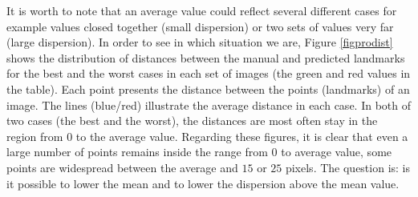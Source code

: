 \documentclass[review]{elsarticle}
\begin{document}
It is worth to note that an average value could reflect several different
cases for example values closed together (small dispersion) or two sets of
values very far (large dispersion). In order to see in which situation
we are, Figure \ref{figprodist} shows the distribution of distances
between the manual and predicted landmarks for the best and the worst
cases in each set of images (the green and red values in the
table). Each point presents the distance between the points
(landmarks) of an image. The lines (blue/red) illustrate the average
distance in each case. In both of two cases (the best and the worst),
the distances are most often stay in the region from 0 to the average
value. Regarding these figures, it is clear that even a large number
of points remains inside the range from $0$ to average value, some
points are widespread between the average and $15$ or $25$ pixels. The
question is: is it possible to lower the mean and to lower the
dispersion above the mean value.
\end{document}
